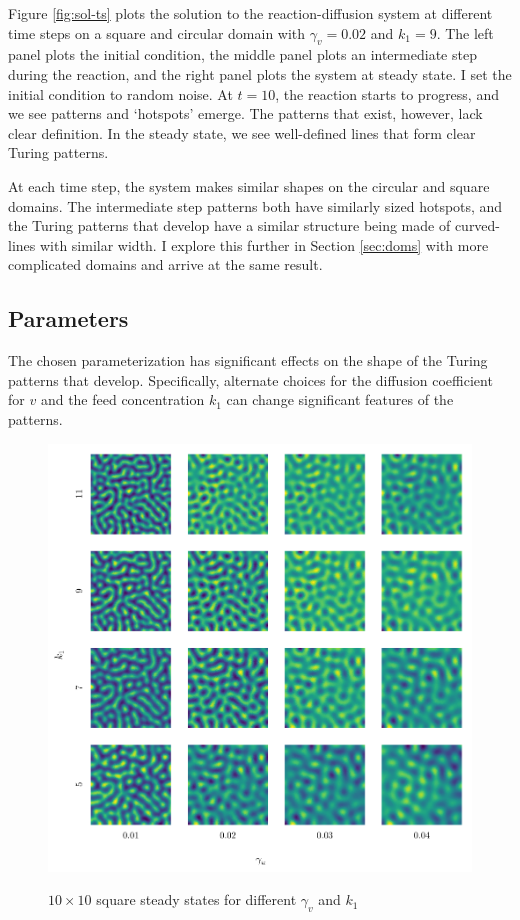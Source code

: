Figure \ref{fig:sol-ts} plots the solution to the reaction-diffusion system at different time steps on a square and circular domain with $\gamma_v = 0.02$ and $k_1 = 9$. The left panel plots the initial condition, the middle panel plots an intermediate step during the reaction, and the right panel plots the system at steady state. I set the initial condition to random noise. At $t = 10$, the reaction starts to progress, and we see patterns and `hotspots' emerge. The patterns that exist, however, lack clear definition. In the steady state, we see well-defined lines that form clear Turing patterns.

At each time step, the system makes similar shapes on the circular and square domains. The intermediate step patterns both have similarly sized hotspots, and the Turing patterns that develop have a similar structure being made of curved-lines with similar width. I explore this further in Section \ref{sec:doms} with more complicated domains and arrive at the same result.


\subsection{Parameters}

The chosen parameterization has significant effects on the shape of the Turing patterns that develop. Specifically, alternate choices for the diffusion coefficient for $v$ and the feed concentration $k_1$ can change significant features of the patterns.

\begin{figure}[t!]
    \centering
    \caption{$10 \times 10$ square steady states for different $\gamma_v$ and $k_1$}
    \includegraphics{figures/square_params.pdf}
    \label{fig:sq-pars}
\end{figure}

